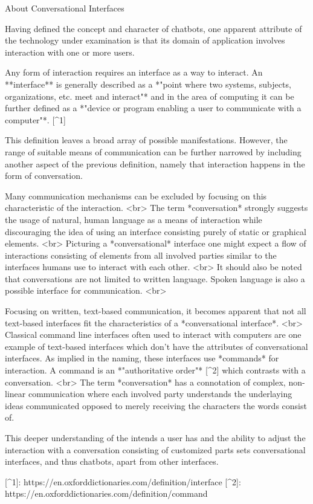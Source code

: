 About Conversational Interfaces


Having defined the concept and character of chatbots, one apparent attribute of the technology under examination is that its domain of application involves interaction with one or more users.

Any form of interaction requires an interface as a way to interact.
An **interface** is generally described as a *"point where two systems, subjects, organizations, etc. meet and interact"* and in the area of computing it can be further defined as a *"device or program enabling a user to communicate with a computer"*. [^1]

This definition leaves a broad array of possible manifestations.
However, the range of suitable means of communication can be further narrowed by including another aspect of the previous definition, namely that interaction happens in the form of conversation.

Many communication mechanisms can be excluded by focusing on this characteristic of the interaction.
<br>
The term *conversation* strongly suggests the usage of natural, human language as a means of interaction while discouraging the idea of using an interface consisting purely of static or graphical elements.
<br>
Picturing a *conversational* interface one might expect a flow of interactions consisting of elements from all involved parties similar to the interfaces humans use to interact with each other.
<br>
It should also be noted that conversations are not limited to written language. Spoken language is also a possible interface for communication.
<br>

Focusing on written, text-based communication, it becomes apparent that not all text-based interfaces fit the characteristics of a *conversational interface*.
<br>
Classical command line interfaces often used to interact with computers are one example of text-based interfaces which don't have the attributes of conversational interfaces.
As implied in the naming, these interfaces use *commands* for interaction.
A command is an *"authoritative order"* [^2] which contrasts with a conversation.
<br>
The term *conversation* has a connotation of complex, non-linear communication where each involved party understands the underlaying ideas communicated opposed to merely receiving the characters the words consist of.

This deeper understanding of the intends a user has and the ability to adjust the interaction with a conversation consisting of customized parts sets conversational interfaces, and thus chatbots, apart from other interfaces.



[^1]: https://en.oxforddictionaries.com/definition/interface
[^2]: https://en.oxforddictionaries.com/definition/command
